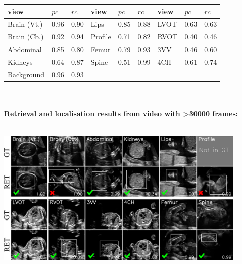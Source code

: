 \documentclass[a0paper,portrait]{baposter}
\begin{document}
\begin{poster}
{\begin{minipage}[c]{\textwidth}
   \centering
   \begin{tabular}{ l l l  | l l l | l l l }
     \toprule
     {\bf view} & {\bf $pc$} & {\bf $rc$} & {\bf view} & {\bf $pc$} & {\bf $rc$}  & {\bf view} & {\bf $pc$} & {\bf $rc$}\\
     \midrule
          Brain (Vt.)  & 0.96 & 0.90 & Lips    & 0.85 & 0.88  & LVOT & 0.63 & 0.63 \\
          Brain (Cb.)  & 0.92 & 0.94 & Profile & 0.71 & 0.82  & RVOT & 0.40 & 0.46 \\
          Abdominal    & 0.85 & 0.80 & Femur   & 0.79 & 0.93  & 3VV  & 0.46 & 0.60 \\
          Kidneys      & 0.64 & 0.87 & Spine   & 0.51 & 0.99  & 4CH  & 0.61 & 0.74 \\
          Background   & 0.96 & 0.93 &         &              &      &      &      \\
     \bottomrule
     \end{tabular}
\end{minipage}\\ 
\vspace{3pt}\\
{\bf Retrieval and localisation results from video with >30000 frames:} \\
\vspace{-2pt}\\
\begin{minipage}[c]{\textwidth}
    \centering
    \includegraphics[width=0.90\textwidth]{ret_loc_collage_final_fixed_part2}
\end{minipage}

} 

\end{poster}
\end{document}

